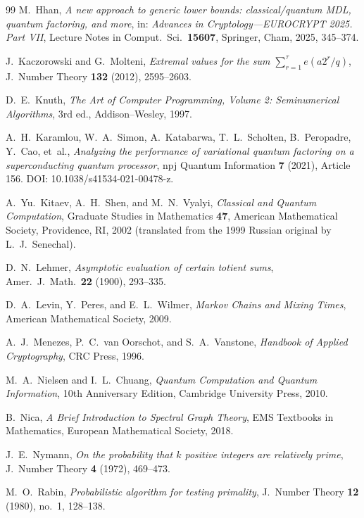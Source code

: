 \documentclass[11pt,reqno]{article}
\numberwithin{equation}{section}
\theoremstyle{plain}
\theoremstyle{definition}
\theoremstyle{remark}
\begin{document}
\begin{thebibliography}{99}
M.~Hhan,
\emph{A new approach to generic lower bounds: classical/quantum MDL, quantum factoring, and more},
in: \emph{Advances in Cryptology---EUROCRYPT 2025. Part VII},
Lecture Notes in Comput.\ Sci.\ \textbf{15607}, Springer, Cham, 2025, 345--374.

J.~Kaczorowski and G.~Molteni,
\emph{Extremal values for the sum $\sum_{r=1}^{\tau} e(a2^r/q)$},
J.\ Number Theory \textbf{132} (2012), 2595--2603.

D.~E.~Knuth,
\emph{The Art of Computer Programming, Volume 2: Seminumerical Algorithms},
3rd ed., Addison--Wesley, 1997.

A.~H.~Karamlou, W.~A.~Simon, A.~Katabarwa, T.~L.~Scholten, B.~Peropadre, Y.~Cao, et~al.,
\emph{Analyzing the performance of variational quantum factoring on a superconducting quantum processor},
npj Quantum Information \textbf{7} (2021), Article 156.
DOI: 10.1038/s41534-021-00478-z.

A.~Yu.~Kitaev, A.~H.~Shen, and M.~N.~Vyalyi,
\emph{Classical and Quantum Computation},
Graduate Studies in Mathematics \textbf{47}, American Mathematical Society, Providence, RI, 2002
(translated from the 1999 Russian original by L.~J.~Senechal).

D.~N.~Lehmer,
\emph{Asymptotic evaluation of certain totient sums},
Amer.\ J.\ Math.\ \textbf{22} (1900), 293--335.

D.~A.~Levin, Y.~Peres, and E.~L.~Wilmer,
\emph{Markov Chains and Mixing Times},
American Mathematical Society, 2009.

A.~J.~Menezes, P.~C.~van Oorschot, and S.~A.~Vanstone,
\emph{Handbook of Applied Cryptography},
CRC Press, 1996.

M.~A.~Nielsen and I.~L.~Chuang,
\emph{Quantum Computation and Quantum Information},
10th Anniversary Edition, Cambridge University Press, 2010.

B.~Nica,
\emph{A Brief Introduction to Spectral Graph Theory},
EMS Textbooks in Mathematics, European Mathematical Society, 2018.

J.~E.~Nymann,
\emph{On the probability that $k$ positive integers are relatively prime},
J.\ Number Theory \textbf{4} (1972), 469--473.

M.~O.~Rabin,
\emph{Probabilistic algorithm for testing primality},
J.\ Number Theory \textbf{12} (1980), no.~1, 128--138.


\end{thebibliography}
\end{document}
